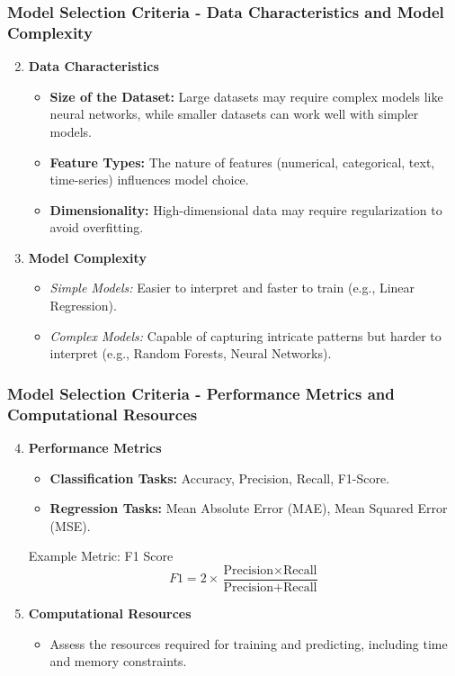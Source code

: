 \documentclass[aspectratio=169]{beamer}
\begin{document}
\begin{frame}[fragile]
    \frametitle{Model Selection Criteria - Data Characteristics and Model Complexity}
    \begin{enumerate}
        \setcounter{enumi}{1}
        \item \textbf{Data Characteristics}
        \begin{itemize}
            \item \textbf{Size of the Dataset:} Large datasets may require complex models like neural networks, while smaller datasets can work well with simpler models.
            \item \textbf{Feature Types:} The nature of features (numerical, categorical, text, time-series) influences model choice.
            \item \textbf{Dimensionality:} High-dimensional data may require regularization to avoid overfitting.
        \end{itemize}
        
        \item \textbf{Model Complexity}
        \begin{itemize}
            \item \textit{Simple Models:} Easier to interpret and faster to train (e.g., Linear Regression).
            \item \textit{Complex Models:} Capable of capturing intricate patterns but harder to interpret (e.g., Random Forests, Neural Networks).
        \end{itemize}
    \end{enumerate}
\end{frame}

\begin{frame}[fragile]
    \frametitle{Model Selection Criteria - Performance Metrics and Computational Resources}
    \begin{enumerate}
        \setcounter{enumi}{3}
        \item \textbf{Performance Metrics}
        \begin{itemize}
            \item \textbf{Classification Tasks:} Accuracy, Precision, Recall, F1-Score.
            \item \textbf{Regression Tasks:} Mean Absolute Error (MAE), Mean Squared Error (MSE).
        \end{itemize}
        \begin{block}{Example Metric: F1 Score}
            \[
            F1 = 2 \times \frac{\text{Precision} \times \text{Recall}}{\text{Precision} + \text{Recall}}
            \]
        \end{block}
        \item \textbf{Computational Resources}
        \begin{itemize}
            \item Assess the resources required for training and predicting, including time and memory constraints.
        \end{itemize}
    \end{enumerate}
\end{frame}
\end{document}
